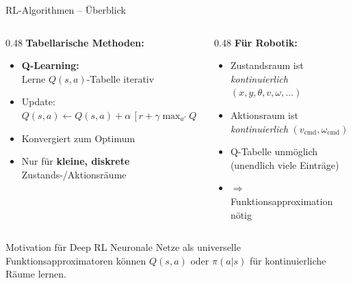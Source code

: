 \documentclass[%
  aspectratio=169,
  10pt
]{beamer}
\newcommand{\warn}[1]{{\color{blackberry}\textbf{#1}}}
\begin{document}
\begin{frame}{RL-Algorithmen -- Überblick}

\begin{columns}[T]
  \begin{column}{0.48\textwidth}
    \textbf{Tabellarische Methoden:}
    \begin{itemize}
      \item \textbf{Q-Learning:}\\
            Lerne $Q(s,a)$-Tabelle iterativ
      \item Update:
            {\small $Q(s,a) \leftarrow Q(s,a) + \alpha\,[r + \gamma \max_{a'} Q(s',a') - Q(s,a)]$}
      \item Konvergiert zum Optimum
      \item Nur für \warn{kleine, diskrete}
            Zustands-/Aktionsräume
    \end{itemize}
  \end{column}
  \begin{column}{0.48\textwidth}
    \textbf{Für Robotik:}
    \begin{itemize}
      \item Zustandsraum ist \emph{kontinuierlich}
            $(x, y, \theta, v, \omega, \ldots)$
      \item Aktionsraum ist \emph{kontinuierlich}
            $(v_\mathrm{cmd}, \omega_\mathrm{cmd})$
      \item Q-Tabelle unmöglich
            (unendlich viele Einträge)
      \item $\Rightarrow$ Funktionsapproximation nötig
    \end{itemize}
  \end{column}
\end{columns}

\vspace{4mm}
\begin{alertblock}{Motivation für Deep RL}
  Neuronale Netze als universelle Funktionsapproximatoren
  können $Q(s,a)$ oder $\pi(a|s)$ für kontinuierliche Räume lernen.
\end{alertblock}

\end{frame}
\end{document}
